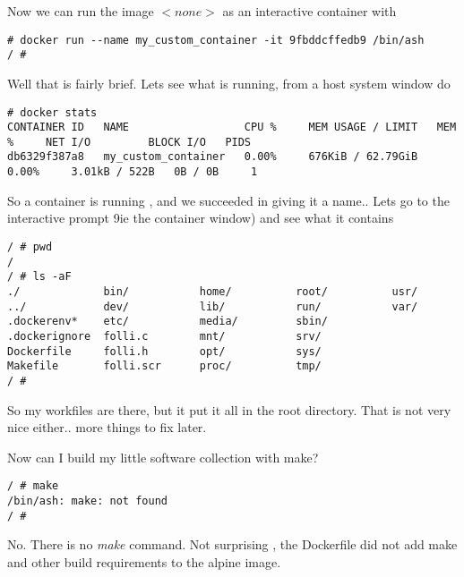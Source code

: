 \documentclass{article}  %
\begin{document}
Now we can run the image $<none>$ as an interactive container with 
\begin{verbatim}
# docker run --name my_custom_container -it 9fbddcffedb9 /bin/ash
/ # 
\end{verbatim}
Well that is fairly brief. Lets see what is running, from a host system window do
\begin{verbatim}
# docker stats
CONTAINER ID   NAME                  CPU %     MEM USAGE / LIMIT   MEM %     NET I/O         BLOCK I/O   PIDS
db6329f387a8   my_custom_container   0.00%     676KiB / 62.79GiB   0.00%     3.01kB / 522B   0B / 0B     1
\end{verbatim}
So a container is running , and we succeeded in giving it a name.. Lets go to the interactive prompt 9ie the container window) and see what it contains
\begin{verbatim}
/ # pwd
/
/ # ls -aF
./             bin/           home/          root/          usr/
../            dev/           lib/           run/           var/
.dockerenv*    etc/           media/         sbin/
.dockerignore  folli.c        mnt/           srv/
Dockerfile     folli.h        opt/           sys/
Makefile       folli.scr      proc/          tmp/
/ # 
\end{verbatim}
 So my workfiles are there, but it put it all in the root directory.  That is not very nice either.. more things to fix later.

Now can I build my little software collection with make?
\begin{verbatim}
/ # make
/bin/ash: make: not found
/ # 
\end{verbatim}
 No. There is no {\em make} command. Not surprising , the Dockerfile did not add make and other build requirements to the alpine image. 
\end{document}
